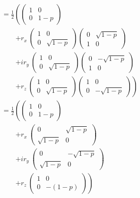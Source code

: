 \documentclass{scrartcl}
\newcommand{\inv}[1]{\frac{1}{#1}}
\DeclareRobustCommand{\[}{\begin{equation}}
\DeclareRobustCommand{\]}{\end{equation}}
\begin{document}
\begin{enumerate}
\begin{enumerate}[a)]
\begin{align}
                &= \inv{2} \left( \begin{pmatrix} 1 & 0 \\ 0 & 1 - p \end{pmatrix} \right. \\
                &\quad \quad \left. + r_x \ \begin{pmatrix} 1 & 0 \\ 0 & \sqrt{1 - p} \end{pmatrix} \begin{pmatrix} 0 & \sqrt{1 - p} \\ 1 & 0 \end{pmatrix} \right. \\
                &\quad \quad \left. + i r_y \ \begin{pmatrix} 1 & 0 \\ 0 & \sqrt{1 - p} \end{pmatrix} \begin{pmatrix} 0 & -\sqrt{1 - p} \\ 1 & 0 \end{pmatrix} \right. \\
                &\quad \quad \left. + r_z \ \begin{pmatrix} 1 & 0 \\ 0 & \sqrt{1 - p} \end{pmatrix} \begin{pmatrix} 1 & 0 \\ 0 & -\sqrt{1 - p} \end{pmatrix} \right) \\
                &= \inv{2} \left( \begin{pmatrix} 1 & 0 \\ 0 & 1 - p \end{pmatrix} \right. \\
                &\quad \quad \left. + r_x \ \begin{pmatrix} 0 & \sqrt{1 - p} \\ \sqrt{1 - p} & 0 \end{pmatrix}  \right. \\
                &\quad \quad \left. + i r_y \ \begin{pmatrix} 0 & -\sqrt{1 - p} \\ \sqrt{1 - p} & 0 \end{pmatrix} \right. \\
                &\quad \quad \left. + r_z \ \begin{pmatrix} 1 & 0 \\ 0 & -(1 - p) \end{pmatrix} \right) \\

\end{align}
\end{enumerate}
\end{enumerate}
\end{document}

